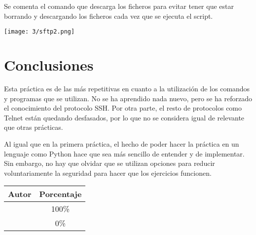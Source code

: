 Se comenta el comando que descarga los ficheros para evitar tener que estar borrando y
descargando los ficheros cada vez que se ejecuta el script.

\begin{minipage}{\linewidth}
    \centering
    \texttt{[image: 3/sftp2.png]}
    \label{fig:3/14}
\end{minipage}

\section{Conclusiones}
Esta práctica es de las más repetitivas en cuanto a la utilización de los comandos
y programas que se utilizan. No se ha aprendido nada nuevo, pero se ha reforzado
el conocimiento del protocolo SSH{.} Por otra parte, el resto de protocolos como
Telnet están quedando desfasados, por lo que no se considera igual de relevante
que otras prácticas.

Al igual que en la primera práctica, el hecho de poder hacer la práctica en un
lenguaje como Python hace que sea más sencillo de entender y de implementar. Sin
embargo, no hay que olvidar que se utilizan opciones para reducir voluntariamente
la seguridad para hacer que los ejercicios funcionen.

\begin{center}
	\begin{tabular}{|c|c|}
		\hline
		\textbf{Autor} & \textbf{Porcentaje} \\
		\hline
		\hline
		\authorOne & 100\% \\
		\authorTwo & 0\% \\
		\hline
	\end{tabular}
\end{center}
